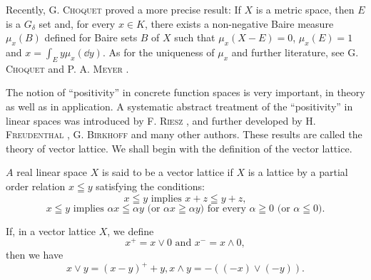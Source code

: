 Recently, G. \textsc{Choquet} \cite{choquet33} proved a more precise result: If $X$ is a metric space, then $E$ is a $G_{\delta}$ set and, for every $x \in K$, there exists a non-negative Baire measure $\mu_x(B)$ defined for Baire sets $B$ of $X$ such that $\mu_x(X - E) = 0$, $\mu_x(E) = 1$ and $x = \int_E y \mu_x(\dd y)$. As for the uniqueness of $\mu_x$ and further literature, see G. \textsc{Choquet} and P. A. \textsc{Meyer} \cite{choquet34}. 


\label{sec:XII.2}

The notion of ``positivity'' in concrete function spaces is very important, in theory as well as in application. A systematic abstract treatment of the ``positivity'' in linear spaces was introduced by F. \textsc{Riesz} \cite{rickart277}, and further developed by H. \textsc{Freudenthal} \cite{freudenthal67}, G. \textsc{Birkhoff} \cite{birkhoff17} and many other authors. These results are called the theory of vector lattice. We shall begin with the definition of the vector lattice. 

\begin{definition}\label{def:XII.2.Definition.1} $A$ real linear space $X$ is said to be a vector lattice if $X$ is a lattice by a partial order relation $x \leqq y$ satisfying the conditions: 
\begin{equation}\label{eq:XII.2.1}
x \leqq y \text{ implies } x + z \leqq y + z,
\end{equation}
\begin{equation}\label{eq:XII.2.2}
x \leqq y \text{ implies } \alpha x \leqq \alpha y \text{ (or } \alpha x \geqq \alpha y\text{) for every } \alpha \geqq 0 \text{ (or } \alpha \leqq 0\text{)}.
\end{equation}
\end{definition}


\begin{proposition}\label{prop:XII.2.Proposition.1} If, in a vector lattice $X$, we define 
\begin{equation}\label{eq:XII.2.3}
x ^{+} = x \vee 0 \text{ and } x ^{-} = x \wedge 0,
\end{equation}
then we have 
\begin{equation}\label{eq:XII.2.4}
x \vee y = (x - y) ^{+} + y, x \wedge y = - ((- x) \vee (- y)).
\end{equation}
\end{proposition}

